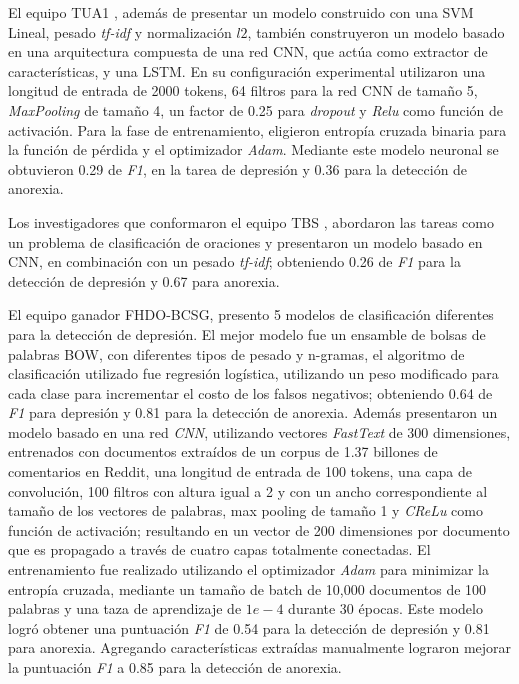 El equipo TUA1 \citep{liu2018tua1}, además de presentar un modelo construido con una SVM Lineal, pesado \textit{tf-idf} y normalización $l2$, también construyeron un modelo basado en una arquitectura compuesta de una red CNN, que actúa como extractor de características, y una LSTM. En su configuración experimental utilizaron una longitud de entrada de 2000 tokens, 64 filtros para la red CNN de tamaño 5, \textit{MaxPooling} de tamaño 4, un factor de 0.25 para \textit{dropout} y \textit{Relu} como función de activación. Para la fase de entrenamiento, eligieron entropía cruzada binaria para la función de pérdida y el optimizador \textit{Adam}. Mediante este modelo neuronal se obtuvieron 0.29 de \textit{F1}, en la tarea de depresión y 0.36 para la detección de anorexia. 

Los investigadores que conformaron el equipo TBS \citep{wang2018neural}, abordaron las tareas como un problema de clasificación de oraciones y presentaron un modelo basado en CNN, en combinación con un pesado \textit{tf-idf}; obteniendo 0.26 de \textit{F1} para la detección de depresión y 0.67 para anorexia.

El equipo ganador \citep{trotzek2018word} FHDO-BCSG, presento 5 modelos de clasificación diferentes para la detección de depresión. El mejor modelo fue un ensamble de bolsas de palabras BOW, con diferentes tipos de pesado y n-gramas, el algoritmo de clasificación utilizado fue regresión logística, utilizando un peso modificado para cada clase para incrementar el costo de los falsos negativos; obteniendo 0.64 de \textit{F1} para depresión y 0.81 para la detección de anorexia. 
Además presentaron un modelo basado en una red \textit{CNN}, utilizando vectores \textit{FastText} de 300 dimensiones, entrenados con documentos extraídos de un corpus de 1.37 billones de comentarios en Reddit, una longitud de entrada de 100 tokens, una capa de convolución, 100 filtros con altura igual a 2 y con un ancho correspondiente al tamaño de los vectores de palabras, max pooling de tamaño 1 y \textit{CReLu} como función de activación; resultando en un vector de 200 dimensiones por documento que es propagado a través de cuatro capas totalmente conectadas. El entrenamiento fue realizado utilizando el optimizador \textit{Adam} para minimizar la entropía cruzada, mediante un tamaño de batch de 10,000 documentos de 100 palabras y una taza de aprendizaje de $1e-4$ durante 30 épocas. Este modelo logró obtener una puntuación \textit{F1} de 0.54 para la detección de depresión y 0.81 para anorexia. Agregando características extraídas manualmente lograron mejorar la puntuación \textit{F1} a 0.85 para la detección de anorexia.

